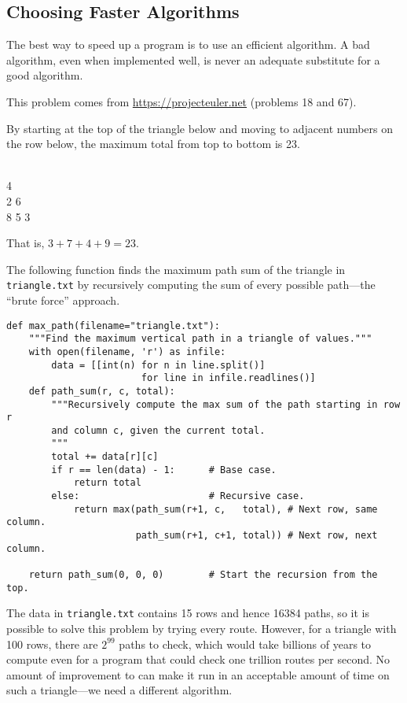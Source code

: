 \subsection*{Choosing Faster Algorithms} %

The best way to speed up a program is to use an efficient algorithm.
A bad algorithm, even when implemented well, is never an adequate substitute for a good algorithm.

\begin{problem} %
This problem comes from \url{https://projecteuler.net} (problems 18 and 67).

By starting at the top of the triangle below and moving to adjacent numbers on the row below, the maximum total from top to bottom is 23.
\begin{center}
\textbf{\color{red}{3}}\\
\textbf{\color{red}{7}} 4\\
2 \textbf{\color{red}{4}} 6\\
8 5 \textbf{\color{red}{9}} 3
\end{center}
That is, $3 + 7 + 4 + 9 = 23$.

The following function finds the maximum path sum of the triangle in \texttt{triangle.txt} by recursively computing the sum of every possible path---the ``brute force'' approach.
\begin{lstlisting}
def max_path(filename="triangle.txt"):
    """Find the maximum vertical path in a triangle of values."""
    with open(filename, 'r') as infile:
        data = [[int(n) for n in line.split()]
                        for line in infile.readlines()]
    def path_sum(r, c, total):
        """Recursively compute the max sum of the path starting in row r
        and column c, given the current total.
        """
        total += data[r][c]
        if r == len(data) - 1:      # Base case.
            return total
        else:                       # Recursive case.
            return max(path_sum(r+1, c,   total), # Next row, same column.
                       path_sum(r+1, c+1, total)) # Next row, next column.

    return path_sum(0, 0, 0)        # Start the recursion from the top.
\end{lstlisting}

The data in \texttt{triangle.txt} contains 15 rows and hence 16384 paths, so it is possible to solve this problem by trying every route.
However, for a triangle with 100 rows, there are $2^{99}$ paths to check, which would take billions of years to compute even for a program that could check one trillion routes per second.
No amount of improvement to  can make it run in an acceptable amount of time on such a triangle---we need a different algorithm.


\end{problem}
